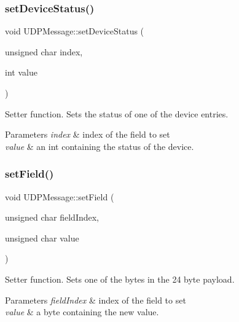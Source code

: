 \subsubsection{\texorpdfstring{set\+Device\+Status()}{setDeviceStatus()}}
{\footnotesize\ttfamily void U\+D\+P\+Message\+::set\+Device\+Status (\begin{DoxyParamCaption}\item[{unsigned char}]{index,  }\item[{int}]{value }\end{DoxyParamCaption})\hspace{0.3cm}{\ttfamily [inline]}}

Setter function. Sets the status of one of the device entries. 
\begin{DoxyParams}{Parameters}
{\em index} & index of the field to set \\
\hline
{\em value} & an int containing the status of the device. \\
\hline
\end{DoxyParams}
\mbox{\label{class_u_d_p_message_ad7f1c729cf357be18e6cda695f5e5d99}} 
\subsubsection{\texorpdfstring{set\+Field()}{setField()}}
{\footnotesize\ttfamily void U\+D\+P\+Message\+::set\+Field (\begin{DoxyParamCaption}\item[{unsigned char}]{field\+Index,  }\item[{unsigned char}]{value }\end{DoxyParamCaption})\hspace{0.3cm}{\ttfamily [inline]}}

Setter function. Sets one of the bytes in the 24 byte payload. 
\begin{DoxyParams}{Parameters}
{\em field\+Index} & index of the field to set \\
\hline
{\em value} & a byte containing the new value. \\
\hline
\end{DoxyParams}
\mbox{\label{class_u_d_p_message_a2fcacc64fbb5598848a391c9fd9aa8c2}} 

